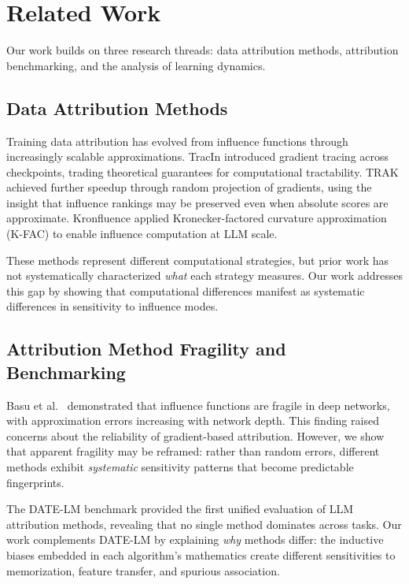 \section{Related Work}

Our work builds on three research threads: data attribution methods, attribution benchmarking, and the analysis of learning dynamics.

\subsection{Data Attribution Methods}

Training data attribution has evolved from influence functions \cite{koh2017understanding} through increasingly scalable approximations. TracIn \cite{pruthi2020estimating} introduced gradient tracing across checkpoints, trading theoretical guarantees for computational tractability. TRAK \cite{park2023trak} achieved further speedup through random projection of gradients, using the insight that influence rankings may be preserved even when absolute scores are approximate. Kronfluence \cite{grosse2023studying} applied Kronecker-factored curvature approximation (K-FAC) to enable influence computation at LLM scale.

These methods represent different computational strategies, but prior work has not systematically characterized \emph{what} each strategy measures. Our work addresses this gap by showing that computational differences manifest as systematic differences in sensitivity to influence modes.

\subsection{Attribution Method Fragility and Benchmarking}

Basu et al.\ \cite{basu2020influence} demonstrated that influence functions are fragile in deep networks, with approximation errors increasing with network depth. This finding raised concerns about the reliability of gradient-based attribution. However, we show that apparent fragility may be reframed: rather than random errors, different methods exhibit \emph{systematic} sensitivity patterns that become predictable fingerprints.

The DATE-LM benchmark \cite{jiao2025datelm} provided the first unified evaluation of LLM attribution methods, revealing that no single method dominates across tasks. Our work complements DATE-LM by explaining \emph{why} methods differ: the inductive biases embedded in each algorithm's mathematics create different sensitivities to memorization, feature transfer, and spurious association.

